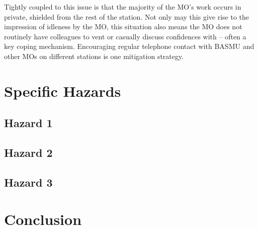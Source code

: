 \documentclass[12pt,a4paper]{article}
\begin{document}
Tightly coupled to this issue is that the majority of the MO's work occurs in private, shielded from the rest of the station. Not only may this give rise to the impression of idleness by the MO, this situation also means the MO does not routinely have colleagues to vent or casually discuss confidences with -- often a key coping mechanism. Encouraging regular telephone contact with BASMU and other MOs on different stations is one mitigation strategy.

\section{Specific Hazards}

\subsection{Hazard 1}

\subsection{Hazard 2}

\subsection{Hazard 3}

\section{Conclusion}
\end{document}
